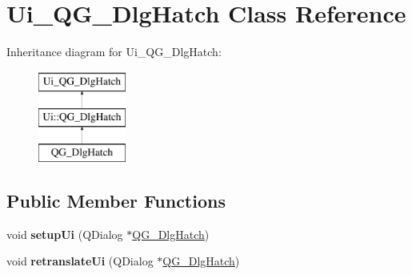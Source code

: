 \hypertarget{classUi__QG__DlgHatch}{\section{Ui\-\_\-\-Q\-G\-\_\-\-Dlg\-Hatch Class Reference}
\label{classUi__QG__DlgHatch}
}
Inheritance diagram for Ui\-\_\-\-Q\-G\-\_\-\-Dlg\-Hatch\-:\begin{figure}[H]
\begin{center}
\leavevmode
\includegraphics[height=3.000000cm]{classUi__QG__DlgHatch}
\end{center}
\end{figure}
\subsection*{Public Member Functions}
\begin{DoxyCompactItemize}
\item 
\hypertarget{classUi__QG__DlgHatch_a37da8e50b7c77a14fbe770499178487d}{void {\bfseries setup\-Ui} (Q\-Dialog $\ast$\hyperlink{classQG__DlgHatch}{Q\-G\-\_\-\-Dlg\-Hatch})}\label{classUi__QG__DlgHatch_a37da8e50b7c77a14fbe770499178487d}

\item 
\hypertarget{classUi__QG__DlgHatch_a03bc7e7c05964746a0c779a619c89240}{void {\bfseries retranslate\-Ui} (Q\-Dialog $\ast$\hyperlink{classQG__DlgHatch}{Q\-G\-\_\-\-Dlg\-Hatch})}\label{classUi__QG__DlgHatch_a03bc7e7c05964746a0c779a619c89240}

\end{DoxyCompactItemize}
